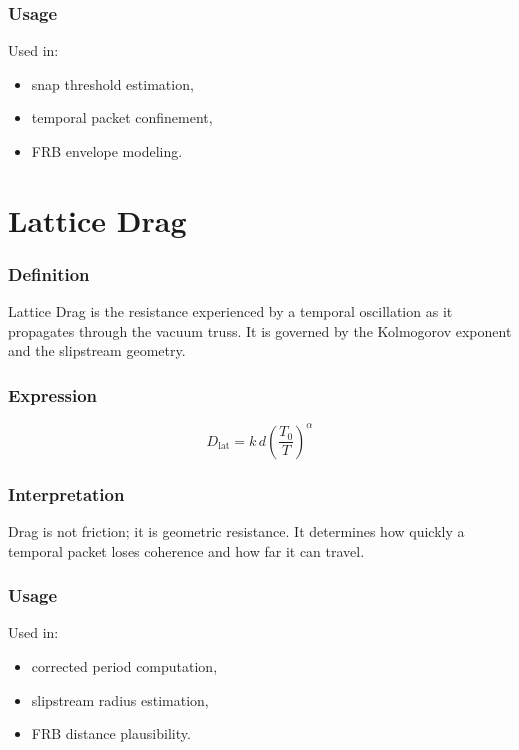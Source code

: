 \documentclass[12pt,oneside]{book}
\begin{document}
\subsubsection{Usage}
Used in:
\begin{itemize}
    \item snap threshold estimation,
    \item temporal packet confinement,
    \item FRB envelope modeling.
\end{itemize}


\section{Lattice Drag}

\subsubsection{Definition}
Lattice Drag is the resistance experienced by a temporal oscillation as it propagates through the
vacuum truss. It is governed by the Kolmogorov exponent and the slipstream geometry.

\subsubsection{Expression}


\[
D_{\mathrm{lat}} = k \, d \left( \frac{T_0}{T} \right)^{\alpha}
\]



\subsubsection{Interpretation}
Drag is not friction; it is geometric resistance.  
It determines how quickly a temporal packet loses coherence and how far it can travel.

\subsubsection{Usage}
Used in:
\begin{itemize}
    \item corrected period computation,
    \item slipstream radius estimation,
    \item FRB distance plausibility.
\end{itemize}
\end{document}
